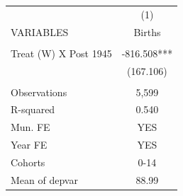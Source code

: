 \begin{tabular}{lc} \hline
 & (1) \\
VARIABLES & Births \\ \hline
 &  \\
Treat (W) X Post 1945 & -816.508*** \\
 & (167.106) \\
 &  \\
Observations & 5,599 \\
R-squared & 0.540 \\
Mun. FE & YES \\
Year FE & YES \\
Cohorts & 0-14 \\
 Mean of depvar & 88.99 \\ \hline
\end{tabular}
